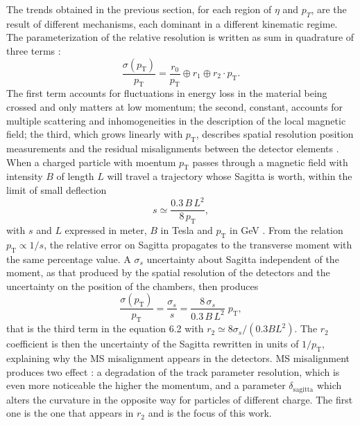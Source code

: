 \documentclass[11pt,a4paper,twoside,openright]{report}
\begin{document}
The trends obtained in the previous section, for each region of $\eta$ and $p_{T}$, are the result of different mechanisms, each dominant in a different kinematic regime. The parameterization of the relative resolution is written as sum in quadrature of three terms\cite{ATLAS-MUON-2016, ATLAS-MCP-2023} :
\begin{equation}
  \frac{\sigma(p_{\mathrm{T}})}{p_{\mathrm{T}}}
  = \frac{r_0}{p_{\mathrm{T}}} \oplus r_1 \oplus r_2 \cdot p_{\mathrm{T}} .
  \label{eq:parametrizzazione}
\end{equation}
The first term accounts for fluctuations in energy loss in the material being crossed and only matters at low momentum; the second, constant, accounts for multiple scattering and inhomogeneities in the description of the local magnetic field; the third, which
grows linearly with $p_{\mathrm{T}}$, describes spatial resolution
position measurements and the residual misalignments between the
detector elements \cite{ATLAS-MCP-2023}. When a charged particle with moentum $p_{\mathrm{T}}$ passes through a magnetic field with intensity $B$ of length $L$ will travel a trajectory whose
Sagitta is worth, within the limit of small deflection
\begin{equation}
  s \simeq \frac{0.3\,B\,L^{2}}{8\,p_{\mathrm{T}}},
  \label{eq:sagitta}
\end{equation}
%
with $s$ and $L$ expressed in meter, $B$ in Tesla and $p_{\mathrm{T}}$ in
GeV \cite{Gluckstern1963}. From the relation
$p_{\mathrm{T}}\propto1/s$, the relative error on Sagitta propagates to the transverse moment with the same percentage value. A $\sigma_s$ uncertainty about Sagitta independent of the moment, as
that produced by the spatial resolution of the detectors and the uncertainty on the position of the chambers, then produces
\begin{equation}
  \frac{\sigma(p_{\mathrm{T}})}{p_{\mathrm{T}}}
  = \frac{\sigma_s}{s}
  = \frac{8\,\sigma_s}{0.3\,B\,L^{2}}\; p_{\mathrm{T}} ,
  \label{eq:sagitta-risoluzione}
\end{equation}
%
that is the third term in the equation 6.2 with $r_2 \simeq 8\sigma_s/(0.3BL^{2})$. The $r_2$ coefficient is then the uncertainty of the Sagitta rewritten in units of $1/p_{\mathrm{T}}$, explaining why the MS misalignment appears in the detectors. MS misalignment produces two effect \cite{ATLAS-ID-ALIGN-2020}: a degradation of the track parameter resolution, which is even more noticeable the higher the momentum, and a parameter $\delta_{\mathrm{sagitta}}$ which alters the curvature in the opposite way for particles of different charge. The first one is the one that appears in $r_2$ and is the focus of this work.
\end{document}
